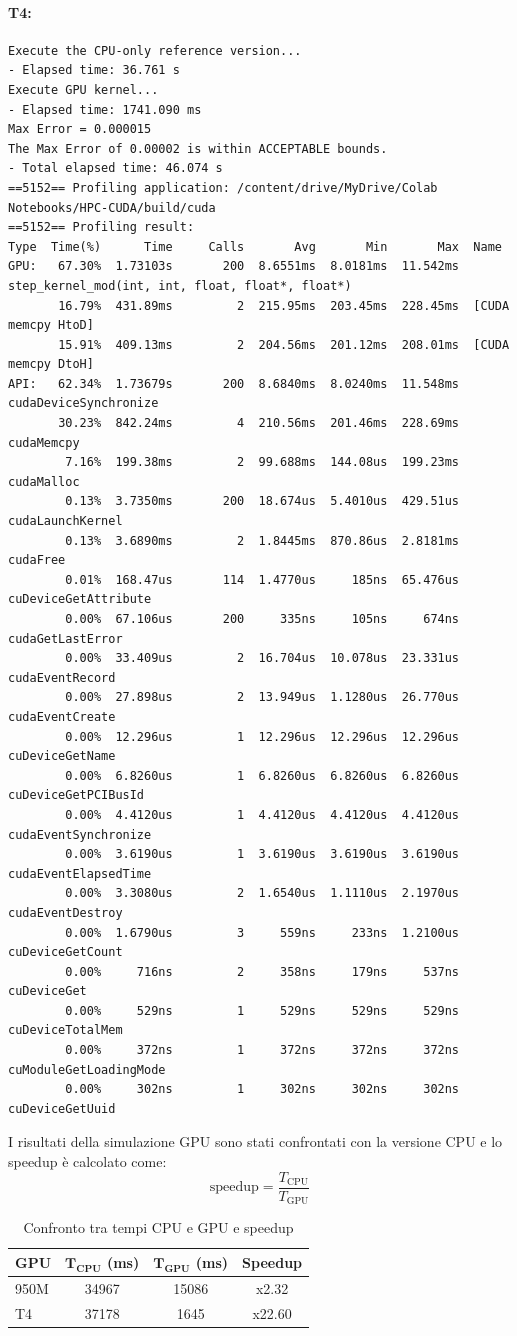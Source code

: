 \paragraph{T4:}
{\scriptsize
\begin{verbatim}
Execute the CPU-only reference version...
- Elapsed time: 36.761 s
Execute GPU kernel...
- Elapsed time: 1741.090 ms
Max Error = 0.000015
The Max Error of 0.00002 is within ACCEPTABLE bounds.
- Total elapsed time: 46.074 s
==5152== Profiling application: /content/drive/MyDrive/Colab Notebooks/HPC-CUDA/build/cuda
==5152== Profiling result:
Type  Time(%)      Time     Calls       Avg       Min       Max  Name
GPU:   67.30%  1.73103s       200  8.6551ms  8.0181ms  11.542ms  step_kernel_mod(int, int, float, float*, float*)
       16.79%  431.89ms         2  215.95ms  203.45ms  228.45ms  [CUDA memcpy HtoD]
       15.91%  409.13ms         2  204.56ms  201.12ms  208.01ms  [CUDA memcpy DtoH]
API:   62.34%  1.73679s       200  8.6840ms  8.0240ms  11.548ms  cudaDeviceSynchronize
       30.23%  842.24ms         4  210.56ms  201.46ms  228.69ms  cudaMemcpy
        7.16%  199.38ms         2  99.688ms  144.08us  199.23ms  cudaMalloc
        0.13%  3.7350ms       200  18.674us  5.4010us  429.51us  cudaLaunchKernel
        0.13%  3.6890ms         2  1.8445ms  870.86us  2.8181ms  cudaFree
        0.01%  168.47us       114  1.4770us     185ns  65.476us  cuDeviceGetAttribute
        0.00%  67.106us       200     335ns     105ns     674ns  cudaGetLastError
        0.00%  33.409us         2  16.704us  10.078us  23.331us  cudaEventRecord
        0.00%  27.898us         2  13.949us  1.1280us  26.770us  cudaEventCreate
        0.00%  12.296us         1  12.296us  12.296us  12.296us  cuDeviceGetName
        0.00%  6.8260us         1  6.8260us  6.8260us  6.8260us  cuDeviceGetPCIBusId
        0.00%  4.4120us         1  4.4120us  4.4120us  4.4120us  cudaEventSynchronize
        0.00%  3.6190us         1  3.6190us  3.6190us  3.6190us  cudaEventElapsedTime
        0.00%  3.3080us         2  1.6540us  1.1110us  2.1970us  cudaEventDestroy
        0.00%  1.6790us         3     559ns     233ns  1.2100us  cuDeviceGetCount
        0.00%     716ns         2     358ns     179ns     537ns  cuDeviceGet
        0.00%     529ns         1     529ns     529ns     529ns  cuDeviceTotalMem
        0.00%     372ns         1     372ns     372ns     372ns  cuModuleGetLoadingMode
        0.00%     302ns         1     302ns     302ns     302ns  cuDeviceGetUuid
\end{verbatim}
}

\noindent
I risultati della simulazione GPU sono stati confrontati con la versione CPU e lo speedup è calcolato come: 
\[
\text{speedup} = \frac{T_\text{CPU}}{T_\text{GPU}}
\]
\begin{table}[h!]
\centering
\begin{tabular}{lccc}
\hline
\textbf{GPU} & $\mathbf{T_{CPU}}$ (ms) & $\mathbf{T_{GPU}}$ (ms) & \textbf{Speedup} \\
\hline
950M & 34967 & 15086 & x2.32 \\
T4   & 37178 & 1645  & x22.60 \\
\hline
\end{tabular}
\caption{Confronto tra tempi CPU e GPU e speedup}
\end{table}